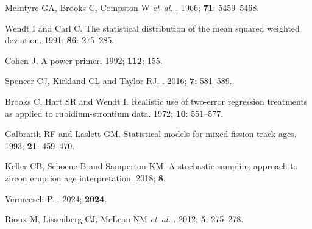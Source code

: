 \documentclass{article}
\begin{document}
\begin{thebibliography}{1}

{McIntyre} GA, {Brooks} C, {Compston} W {\em et~al.}
.
  1966; {\bf 71}: 5459--5468.

Wendt I and Carl C.
\newblock The statistical distribution of the mean squared weighted deviation.
  1991; {\bf 86}:
  275--285.

Cohen J.
\newblock A power primer.
  1992; {\bf 112}: 155.

Spencer CJ, Kirkland CL and Taylor RJ.
.
  2016; {\bf 7}: 581--589.

Brooks C, Hart SR and Wendt I.
\newblock Realistic use of two-error regression treatments as applied to
  rubidium-strontium data.
  1972; {\bf 10}: 551--577.

Galbraith RF and Laslett GM.
\newblock Statistical models for mixed fission track ages.
  1993; {\bf 21}:
  459--470.

Keller CB, Schoene B and Samperton KM.
\newblock A stochastic sampling approach to zircon eruption age interpretation.
  2018; {\bf 8}.

Vermeesch P.
.
  2024; {\bf 2024}.

Rioux M, Lissenberg CJ, McLean NM {\em et~al.}
.
  2012; {\bf 5}: 275--278.

\end{thebibliography}
\end{document}
